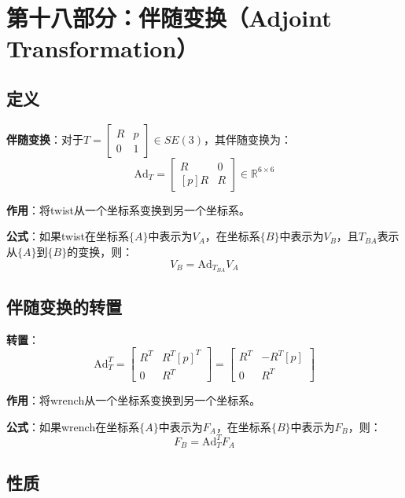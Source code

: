 \documentclass[12pt,a4paper]{article}
\begin{document}
\section{第十八部分：伴随变换（Adjoint Transformation）}

\subsection{定义}

\textbf{伴随变换}：对于$T = \begin{bmatrix} R & p \\ 0 & 1 \end{bmatrix} \in SE(3)$，其伴随变换为：
\begin{equation}
\text{Ad}_T = \begin{bmatrix} R & 0 \\ [p]R & R \end{bmatrix} \in \mathbb{R}^{6 \times 6}
\end{equation}

\textbf{作用}：将twist从一个坐标系变换到另一个坐标系。

\textbf{公式}：如果twist在坐标系$\{A\}$中表示为$V_A$，在坐标系$\{B\}$中表示为$V_B$，且$T_{BA}$表示从$\{A\}$到$\{B\}$的变换，则：
\begin{equation}
V_B = \text{Ad}_{T_{BA}} V_A
\end{equation}

\subsection{伴随变换的转置}

\textbf{转置}：
\begin{equation}
\text{Ad}_T^T = \begin{bmatrix} R^T & R^T[p]^T \\ 0 & R^T \end{bmatrix} = \begin{bmatrix} R^T & -R^T[p] \\ 0 & R^T \end{bmatrix}
\end{equation}

\textbf{作用}：将wrench从一个坐标系变换到另一个坐标系。

\textbf{公式}：如果wrench在坐标系$\{A\}$中表示为$F_A$，在坐标系$\{B\}$中表示为$F_B$，则：
\begin{equation}
F_B = \text{Ad}_T^T F_A
\end{equation}

\subsection{性质}
\end{document}
